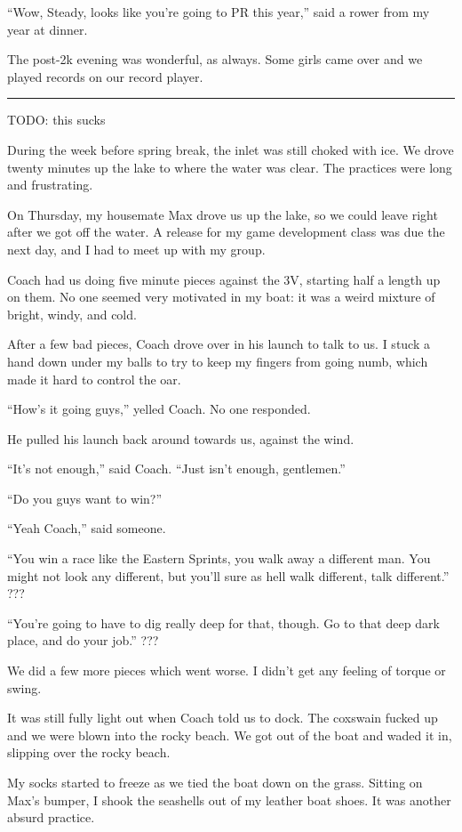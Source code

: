 ``Wow, Steady, looks like you're going to PR this year,'' said a rower from my
year at dinner.  

The post-2k evening was wonderful, as always.  Some girls came over and we
played records on our record player.  

\plainfancybreak{12pt}{2}{* * *}

TODO: this sucks

During the week before spring break, the inlet was still choked with ice. We
drove twenty minutes up the lake to where the water was clear.  The practices
were long and frustrating.

On Thursday, my housemate Max drove us up the lake, so we could leave right
after we got off the water.  A release for my game development class was due the
next day, and I had to meet up with my group.

Coach had us doing five minute pieces against the 3V, starting half a
length up on them.  No one seemed very motivated in my boat: it was a weird
mixture of bright, windy, and cold. 

After a few bad pieces, Coach drove over in his launch to talk to us.  I stuck a
hand down under my balls to try to keep my fingers from going numb, which made
it hard to control the oar.

``How's it going guys,'' yelled Coach.  No one responded.

He pulled his launch back around towards us, against the wind.

``It's not enough,'' said Coach.  ``Just isn't enough, gentlemen.''

``Do you guys want to win?''

``Yeah Coach,'' said someone.

``You win a race like the Eastern Sprints, you walk away a different man.  You
might not look any different, but you'll sure as hell walk different, talk
different.'' ???

``You're going to have to dig really deep for that, though.  Go to that deep
dark place, and do your job.''  ???

We did a few more pieces which went worse.  I didn't get any feeling of torque
or swing.  

It was still fully light out when Coach told us to dock.  The coxswain fucked up
and we were blown into the rocky beach.  We got out of the boat and waded it in,
slipping over the rocky beach. 

My socks started to freeze as we tied the boat down on the grass.  Sitting on
Max's bumper, I shook the seashells out of my leather boat shoes.  It was
another absurd practice.  

